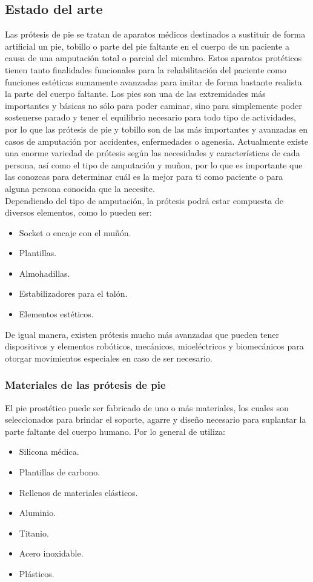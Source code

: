 \documentclass{article}
\begin{document}
\subsection{Estado del arte}
Las prótesis de pie se tratan de aparatos médicos destinados a sustituir de forma artificial un pie, tobillo o parte del pie faltante en el cuerpo de un paciente a causa de una amputación total o parcial del miembro.
Estos aparatos protéticos tienen tanto finalidades funcionales para la rehabilitación del paciente como funciones estéticas sumamente avanzadas para imitar de forma bastante realista la parte del cuerpo faltante.
Los pies son una de las extremidades más importantes y básicas no sólo para poder caminar, sino para simplemente poder sostenerse parado y tener el equilibrio necesario para todo tipo de actividades, por lo que las prótesis de pie y tobillo son de las más importantes y avanzadas en casos de amputación por accidentes, enfermedades o agenesia\cite{rf3}.
Actualmente existe una enorme variedad de prótesis según las necesidades y características de cada persona, así como el tipo de amputación y muñon, por lo que es importante que las conozcas para determinar cuál es la mejor para ti como paciente o para alguna persona conocida que la necesite.\\
Dependiendo del tipo de amputación, la prótesis podrá estar compuesta de diversos elementos, como lo pueden ser:
\begin{itemize}
    \item Socket o encaje con el muñón.
    \item Plantillas.
    \item Almohadillas.
    \item Estabilizadores para el talón.
    \item Elementos estéticos.
\end{itemize}
De igual manera, existen prótesis mucho más avanzadas que pueden tener dispositivos y elementos robóticos, mecánicos, mioeléctricos y biomecánicos para otorgar movimientos especiales en caso de ser necesario.
\subsubsection{Materiales de las prótesis de pie}
El pie prostético puede ser fabricado de uno o más materiales, los cuales son seleccionados para brindar el soporte, agarre y diseño necesario para suplantar la parte faltante del cuerpo humano.
Por lo general de utiliza:
\begin{itemize}
    \item Silicona médica.
    \item Plantillas de carbono.
    \item Rellenos de materiales elásticos.
    \item Aluminio.
    \item Titanio.
    \item Acero inoxidable.
    \item Plásticos.
\end{itemize}
\newpage
\end{document}
